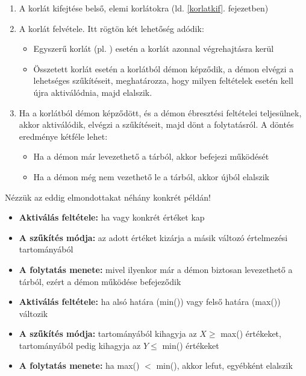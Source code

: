 \begin{enumerate}
\item A korlát kifejtése belső, elemi korlátokra (ld. \ref{korlatkif}. fejezetben)
\item A korlát felvétele. Itt rögtön két lehetőség adódik:

	\begin{itemize}
	\item Egyszerű korlát (pl. ) esetén a korlát azonnal végrehajtásra kerül
	\item Összetett korlát esetén a korlátból démon képződik, a démon elvégzi a
	lehetséges szűkítéseit, meghatározza, hogy milyen feltételek esetén kell újra
	aktiválódnia, majd elalszik.
	\end{itemize}

\item Ha a korlátból démon képződött, és a démon ébresztési feltételei teljesülnek, akkor
aktiválódik, elvégzi a szűkítéseit, majd dönt a folytatásról. A döntés eredménye kétféle
lehet:

	\begin{itemize}
	\item Ha a démon már levezethető a tárból, akkor befejezi működését
	\item Ha a démon még nem vezethető le a tárból, akkor újból elalszik
	\end{itemize}

\end{enumerate}

Nézzük az eddig elmondottakat néhány konkrét példán!

\begin{itemize}
\item {\bf Aktiválás feltétele:} ha  vagy  konkrét értéket kap
\item {\bf A szűkítés módja:} az adott értéket kizárja a másik változó értelmezési
tartományából
\item {\bf A folytatás menete:} mivel ilyenkor már a démon biztosan levezethető
a tárból, ezért a démon működése befejeződik
\end{itemize}

\begin{itemize}
\item {\bf Aktiválás feltétele:} ha  alsó határa (min()) vagy 
felső határa (max()) változik
\item {\bf A szűkítés módja:}  tartományából kihagyja az $X \ge$ max()
értékeket,  tartományából pedig kihagyja az $Y \le$ min() értékeket
\item {\bf A folytatás menete:} ha max() $<$ min(), akkor lefut,
egyébként elalszik
\end{itemize}

